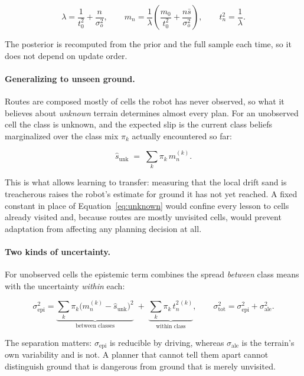 \documentclass[11pt]{article}
\begin{document}
\begin{equation}
  \lambda = \frac{1}{t_0^2} + \frac{n}{\sigma_o^2},
  \qquad
  m_n = \frac{1}{\lambda}\left(\frac{m_0}{t_0^2} + \frac{n \bar{s}}{\sigma_o^2}\right),
  \qquad
  t_n^2 = \frac{1}{\lambda}.
  \label{eq:conjugate}
\end{equation}

The posterior is recomputed from the prior and the full sample each time, so
it does not depend on update order.

\paragraph{Generalizing to unseen ground.}
Routes are composed mostly of cells the robot has never observed, so what it
believes about \emph{unknown} terrain determines almost every plan. For an
unobserved cell the class is unknown, and the expected slip is the current
class beliefs marginalized over the class mix $\pi_k$ actually encountered so
far:

\begin{equation}
  \hat{s}_{\mathrm{unk}} \;=\; \sum_k \pi_k \, m_n^{(k)}.
  \label{eq:unknown}
\end{equation}

This is what allows learning to transfer: measuring that the local drift sand
is treacherous raises the robot's estimate for ground it has not yet reached.
A fixed constant in place of Equation~\ref{eq:unknown} would confine every
lesson to cells already visited and, because routes are mostly unvisited
cells, would prevent adaptation from affecting any planning decision at all.

\paragraph{Two kinds of uncertainty.}
For unobserved cells the epistemic term combines the spread \emph{between}
class means with the uncertainty \emph{within} each:

\begin{equation}
  \sigma_{\mathrm{epi}}^2 = \underbrace{\sum_k \pi_k \bigl(m_n^{(k)} - \hat{s}_{\mathrm{unk}}\bigr)^2}_{\text{between classes}}
  \;+\; \underbrace{\sum_k \pi_k \, t_n^{2\,(k)}}_{\text{within class}},
  \qquad
  \sigma_{\mathrm{tot}}^2 = \sigma_{\mathrm{epi}}^2 + \sigma_{\mathrm{ale}}^2 .
  \label{eq:uncertainty}
\end{equation}

The separation matters: $\sigma_{\mathrm{epi}}$ is reducible by driving,
whereas $\sigma_{\mathrm{ale}}$ is the terrain's own variability and is not. A
planner that cannot tell them apart cannot distinguish ground that is
dangerous from ground that is merely unvisited.
\end{document}
